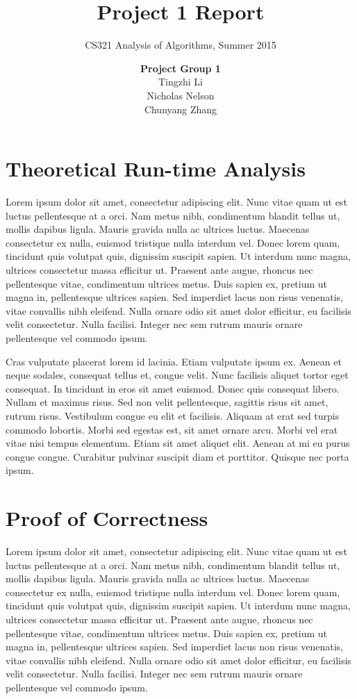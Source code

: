 \documentclass[11pt]{scrreprt}
\title{\textbf{Project 1 Report}}
\subtitle{CS321 Analysis of Algorithms, Summer 2015}
\author{\textbf{Project Group 1}\\
		Tingzhi Li\\
		Nicholas Nelson\\
		Chunyang Zhang}
\date{}
\begin{document}
\maketitle

\chapter{Theoretical Run-time Analysis}

Lorem ipsum dolor sit amet, consectetur adipiscing elit. Nunc vitae quam ut est luctus pellentesque at a orci. Nam metus nibh, condimentum blandit tellus ut, mollis dapibus ligula. Mauris gravida nulla ac ultrices luctus. Maecenas consectetur ex nulla, euismod tristique nulla interdum vel. Donec lorem quam, tincidunt quis volutpat quis, dignissim suscipit sapien. Ut interdum nunc magna, ultrices consectetur massa efficitur ut. Praesent ante augue, rhoncus nec pellentesque vitae, condimentum ultrices metus. Duis sapien ex, pretium ut magna in, pellentesque ultrices sapien. Sed imperdiet lacus non risus venenatis, vitae convallis nibh eleifend. Nulla ornare odio sit amet dolor efficitur, eu facilisis velit consectetur. Nulla facilisi. Integer nec sem rutrum mauris ornare pellentesque vel commodo ipsum.

Cras vulputate placerat lorem id lacinia. Etiam vulputate ipsum ex. Aenean et neque sodales, consequat tellus et, congue velit. Nunc facilisis aliquet tortor eget consequat. In tincidunt in eros sit amet euismod. Donec quis consequat libero. Nullam et maximus risus. Sed non velit pellentesque, sagittis risus sit amet, rutrum risus. Vestibulum congue eu elit et facilisis. Aliquam at erat sed turpis commodo lobortis. Morbi sed egestas est, sit amet ornare arcu. Morbi vel erat vitae nisi tempus elementum. Etiam sit amet aliquet elit. Aenean at mi eu purus congue congue. Curabitur pulvinar suscipit diam et porttitor. Quisque nec porta ipsum. 


\chapter{Proof of Correctness}

Lorem ipsum dolor sit amet, consectetur adipiscing elit. Nunc vitae quam ut est luctus pellentesque at a orci. Nam metus nibh, condimentum blandit tellus ut, mollis dapibus ligula. Mauris gravida nulla ac ultrices luctus. Maecenas consectetur ex nulla, euismod tristique nulla interdum vel. Donec lorem quam, tincidunt quis volutpat quis, dignissim suscipit sapien. Ut interdum nunc magna, ultrices consectetur massa efficitur ut. Praesent ante augue, rhoncus nec pellentesque vitae, condimentum ultrices metus. Duis sapien ex, pretium ut magna in, pellentesque ultrices sapien. Sed imperdiet lacus non risus venenatis, vitae convallis nibh eleifend. Nulla ornare odio sit amet dolor efficitur, eu facilisis velit consectetur. Nulla facilisi. Integer nec sem rutrum mauris ornare pellentesque vel commodo ipsum.
\end{document}
